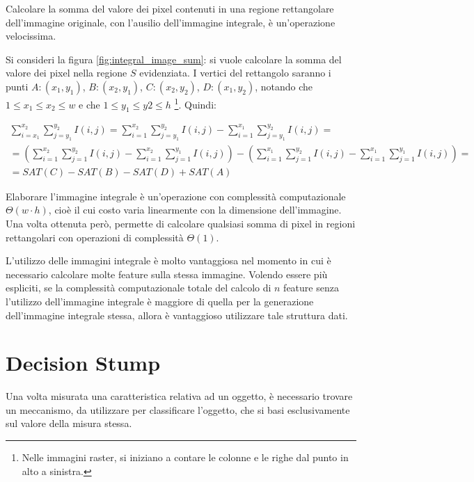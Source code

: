         Calcolare la somma del valore dei pixel contenuti in una regione rettangolare dell'immagine originale, con l'ausilio dell'immagine integrale, è un'operazione velocissima.

        Si consideri la figura \ref{fig:integral_image_sum}: si vuole calcolare la somma del valore dei pixel nella regione $S$ evidenziata. I vertici del rettangolo saranno i punti $A:(x_1,y_1)$, $B:(x_2,y_1)$, $C:(x_2,y_2)$, $D:(x_1, y_2)$, notando che $1 \leq x_1 \leq x_2 \leq w$ e che $1 \leq y_1 \leq y2 \leq h$ \footnote{Nelle immagini raster, si iniziano a contare le colonne e le righe dal punto in alto a sinistra.}.
        Quindi:

        \begin{align*}
            \sum_{i = x_1}^{x_2} \sum_{j = y_1}^{y_2} I(i,j) =
            \sum_{i = 1}^{x_2} \sum_{j = y_1}^{y_2} I(i,j) - \sum_{i = 1}^{x_1} \sum_{j = y_1}^{y_2} I(i,j) = \\
            =
            \left(
            \sum_{i = 1}^{x_2} \sum_{j = 1}^{y_2} I(i,j) -
            \sum_{i = 1}^{x_2} \sum_{j = 1}^{y_1} I(i,j)
            \right)
            -
            \left(
            \sum_{i = 1}^{x_1} \sum_{j = 1}^{y_2} I(i,j) -
            \sum_{i = 1}^{x_1} \sum_{j = 1}^{y_1} I(i,j)
            \right) = \\
            = SAT(C) - SAT(B) - SAT(D) + SAT(A)
        \end{align*}

        Elaborare l'immagine integrale è un'operazione con complessità computazionale $\Theta(w \cdot h)$, cioè il cui costo varia linearmente con la dimensione dell'immagine. Una volta ottenuta però, permette di calcolare qualsiasi somma di pixel in regioni rettangolari con operazioni di complessità $\Theta(1)$.

        L'utilizzo delle immagini integrale è molto vantaggiosa nel momento in cui è necessario calcolare molte feature sulla stessa immagine.
        Volendo essere più espliciti, se la complessità computazionale totale del calcolo di $n$ feature senza l'utilizzo dell'immagine integrale è maggiore di quella per la generazione dell'immagine integrale stessa, allora è vantaggioso utilizzare tale struttura dati.

    \section{Decision Stump}
    \label{sec:decision_stump}
        Una volta misurata una caratteristica relativa ad un oggetto, è necessario trovare un meccanismo, da utilizzare per classificare l'oggetto, che si basi esclusivamente sul valore della misura stessa.        


